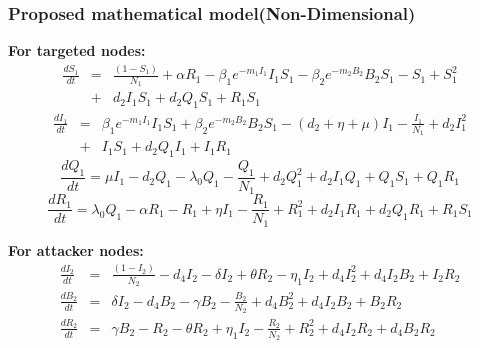 \documentclass{beamer}
\begin{document}
\begin{frame}\frametitle{Proposed mathematical model(Non-Dimensional)}
{\bf For targeted nodes:}
\tiny \begin{eqnarray*}
\frac{d S_1}{dt} &=& \frac{( 1- S_1)}{N_1}+ \alpha R_1 - \beta_1 e^{-m_1 I_1} I_1 S_1- \beta_2 e^{-m_2 B_2} B_2 S_1-S_1+S_1^2 \nonumber \\
&+& d_2 I_1 S_1+d_2 Q_1 S_1+R_1 S_1
\end{eqnarray*}
\tiny \begin{eqnarray*}
\frac{d I_1}{dt}&=& \beta_1 e^{-m_1 I_1} I_1 S_1 +\beta_2 e^{-m_2 B_2} B_2 S_1 - ( d_2+ \eta + \mu) I_1- \frac{ I_1}{N_1}+d_2 I_1^2 \nonumber\\
&+& I_1 S_1+d_2 Q_1 I_1+I_1 R_1
\end{eqnarray*}
\tiny \begin{equation*}
\frac{d Q_1}{dt}= \mu I_1 - d_2 Q_1 - \lambda_0 Q_1- \frac{ Q_1}{N_1}+d_2 Q_1^2+d_2 I_1 Q_1+ Q_1 S_1+Q_1 R_1
\end{equation*}
\tiny \begin{equation*}
\frac{d R_1}{dt}=\lambda_0 Q_1- \alpha R_1- R_1+ \eta I_1- \frac{ R_1}{N_1}+R_1^2+d_2 I_1 R_1+d_2 Q_1 R_1+R_1 S_1
\end{equation*}

{\bf For attacker nodes:}
\tiny \begin{eqnarray*}
  \frac{d I_2}{dt }&=&  \frac{( 1- I_2)}{N_2}- d_4 I_2-\delta I_2 + \theta R_2 -\eta_1 I_2+ d_4 I_2^2+d_4 I_2 B_2+ I_2 R_2 \\
 \frac{d B_2}{d t}&=& \delta I_2 - d_4 B_2 -\gamma B_2- \frac{ B_2}{N_2}+d_4 B_2^2+d_4 I_2 B_2+ B_2 R_2  \\
   \frac{d R_2}{d t} &=& \gamma B_2 - R_2 - \theta R_2+ \eta_1 I_2- \frac{ R_2}{N_2}+R_2^2+d_4 I_2 R_2+d_4 B_2 R_2
\end{eqnarray*}
\end{frame}
\end{document}
